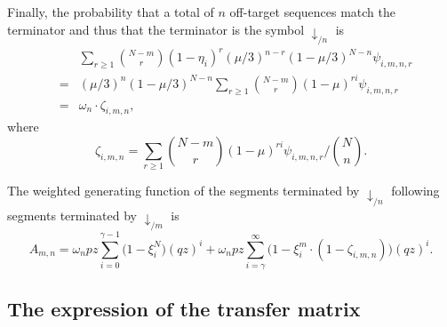 \documentclass{article}
\begin{document}
Finally, the probability that a total of $n$ off-target sequences match
the terminator and thus that the terminator is the symbol
$\downarrow_{/n}$ is
\begin{eqnarray*}
&\;& \sum_{r\geq1} {N-m \choose r}
(1 - \eta_i)^r (\mu/3)^{n-r} (1-\mu/3)^{N-n} \psi_{i,m,n,r} \\
&=& (\mu/3)^n(1-\mu/3)^{N-n} \sum_{r\geq1} {N-m \choose r}
  (1 - \mu)^{ri} \psi_{i,m,n,r} \\
&=& \omega_n \cdot \zeta_{i,m,n},
\end{eqnarray*}
where
\begin{equation}
\label{eq:zeta}
\zeta_{i,m,n} = \sum_{r\geq1} {N-m \choose r}
(1-\mu)^{ri} \psi_{i,m,n,r} \bigg/ {N \choose n}.
\end{equation}


The weighted generating function of the segments terminated by
$\downarrow_{/n}$ following segments terminated by $\downarrow_{/m}$ is
\begin{equation}
\label{eq:A}
A_{m,n} =
\omega_n pz \sum_{i=0}^{\gamma-1} \Big(1 - \xi_i^N \Big) (qz)^i + \omega_n
pz \sum_{i=\gamma}^\infty \Big(1 - \xi_i^m \cdot
(1- \zeta_{i,m,n}) \Big) (qz)^i.
\end{equation}

\subsection{The expression of the transfer matrix}
\label{sec:expression_of_M}
\end{document}
